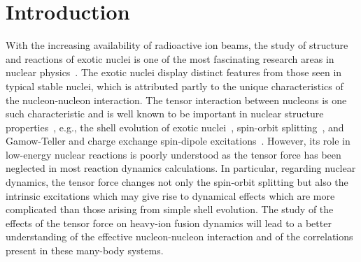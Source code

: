 \documentclass[aps,prc,twocolumn,showpacs,superscriptaddress,longbibliography,nofootinbib,floatfix,10pt]{revtex4-1}
\begin{document}

\maketitle

\section{Introduction}
\label{introduction}

With the increasing availability of radioactive ion beams, the study of structure and reactions of exotic nuclei is
one of the most fascinating research areas in nuclear physics~\cite{Balantekin2014_MPLA29-1430010}.
The exotic nuclei display distinct features from those seen in typical stable nuclei, which is attributed partly to the unique characteristics of the nucleon-nucleon interaction.
The tensor interaction between nucleons is one such characteristic and is well known to be important in nuclear structure
properties~\cite{Lesinski2007_PRC76-014312}, e.g.,
the shell evolution of exotic nuclei~\cite{Otsuka2006_PRL97-162501},
spin-orbit splitting~\cite{Colo2007_PLB646-227}, and Gamow-Teller and charge exchange spin-dipole excitations~\cite{Bai2010_PRL105-072501}.
However, its role in low-energy nuclear reactions is poorly understood as the tensor force has been neglected in most reaction dynamics calculations.
In particular, regarding nuclear dynamics, the tensor force changes not only the spin-orbit splitting but also the intrinsic excitations which may give rise to dynamical effects which are more complicated than those arising from simple shell evolution.
The study of the effects of the tensor force on heavy-ion fusion dynamics will lead to a better understanding of the effective nucleon-nucleon interaction and of the correlations present in these many-body systems.
\end{document}
